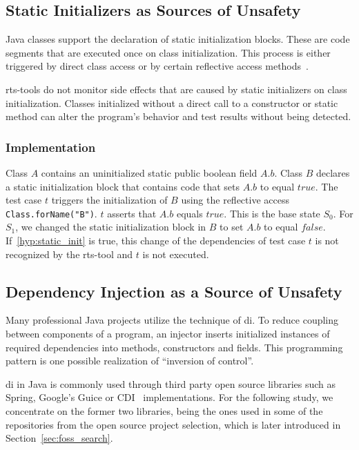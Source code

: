 \subsection{Static Initializers as Sources of Unsafety}

Java classes support the declaration of static initialization blocks. These are code segments that are
executed once on class initialization. This process is either triggered by direct class access or
by certain reflective access methods~\cite[12.4.1]{java_8_spec}.

\begin{hypothesis}\label{hyp:static_init}
    \ac{rts}-tools do not monitor side effects that are caused by static
    initializers on class initialization. Classes initialized without a direct call to a constructor or static method can alter the
    program's behavior and test results without being detected.
\end{hypothesis}

\subsubsection{Implementation }
Class $A$ contains an uninitialized static public boolean field $A.b$. Class $B$ declares a static initialization
block that contains code that sets $A.b$ to equal $true$. The test case $t$ triggers the initialization of $B$ using the
reflective access \texttt{Class.forName("B")}. $t$ asserts that $A.b$ equals $true$. This is the
base state $S_0$. For $S_1$, we changed the static initialization block in
$B$ to set $A.b$ to equal $false$. If~\ref{hyp:static_init} is true, this change of the dependencies of test case $t$ is not
recognized by the \ac{rts}-tool and $t$ is not executed.

\subsection{Dependency Injection as a Source of Unsafety}

Many professional Java projects utilize the technique of \ac{di}. To reduce coupling
between components of a program, an injector inserts initialized instances of required dependencies
into methods, constructors and fields. This programming pattern is one possible realization of
``inversion of control''\cite{inversion_of_control_coiner}.~\cite{inversion_of_control_di}

\ac{di} in Java is commonly used through third party open source libraries such as Spring, Google's Guice or
CDI~\cite{java_cdi_jsr299} implementations. For the following study, we concentrate on the former two libraries, being the ones used in
some of the repositories from the open source project selection, which is later introduced in
Section~\ref{sec:foss_search}.

